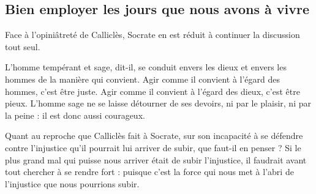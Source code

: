 \subsection*{Bien employer les jours que nous avons à vivre}

Face à l'opiniâtreté de Calliclès, Socrate en est réduit à continuer la discussion tout seul.

L'homme tempérant et sage, dit-il, se conduit envers les dieux et envers les hommes de la manière qui convient. Agir comme il convient à l'égard des hommes, c'est être juste. Agir comme il convient à l'égard des dieux, c'est être pieux. L'homme sage ne se laisse détourner de ses devoirs, ni par le plaisir, ni par la peine : il est donc aussi courageux.

Quant au reproche que Calliclès fait à Socrate, sur son incapacité à se défendre contre l'injustice qu'il pourrait lui arriver de subir, que faut-il en penser ? Si le plus grand mal qui puisse nous arriver était de subir l'injustice, il faudrait avant tout chercher à se rendre fort : puisque c'est la force qui nous met à l'abri de l'injustice que nous pourrions subir.%

%
%
%
